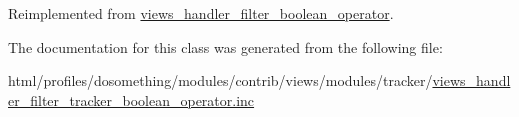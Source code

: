 Reimplemented from \hyperlink{classviews__handler__filter__boolean__operator_ab3afc650701939c060e684d75fa2b21b}{views\_\-handler\_\-filter\_\-boolean\_\-operator}.

The documentation for this class was generated from the following file:\begin{DoxyCompactItemize}
\item 
html/profiles/dosomething/modules/contrib/views/modules/tracker/\hyperlink{views__handler__filter__tracker__boolean__operator_8inc}{views\_\-handler\_\-filter\_\-tracker\_\-boolean\_\-operator.inc}\end{DoxyCompactItemize}
